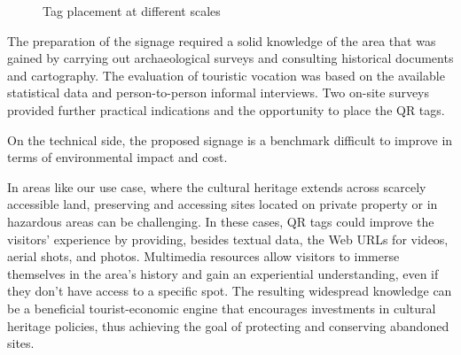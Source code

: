 \documentclass[sustainability,article,submit,pdftex,moreauthors]{Definitions/mdpi}
\begin{document}
\begin{figure}
\hfill
{}
\caption{Tag placement at different scales}
\label{fig:TagPlacement}
\end{figure}

The preparation of the signage required a solid knowledge of the area that was gained by carrying out archaeological surveys and consulting historical documents and cartography. The evaluation of touristic vocation was based on the available statistical data and person-to-person informal interviews. Two on-site surveys provided further practical indications and the opportunity to place the QR tags.

On the technical side, the proposed signage is a benchmark difficult to improve in terms of environmental impact and cost.


In areas like our use case, where the cultural heritage extends across scarcely accessible land, preserving and accessing sites located on private property or in hazardous areas can be challenging. In these cases, QR tags could improve the visitors' experience by providing, besides textual data, the Web URLs for videos, aerial shots, and photos. Multimedia resources allow visitors to immerse themselves in the area's history and gain an experiential understanding, even if they don't have access to a specific spot. The resulting widespread knowledge can be a beneficial tourist-economic engine that encourages investments in cultural heritage policies, thus achieving the goal of protecting and conserving abandoned sites.
\end{document}

